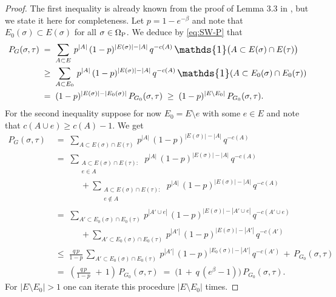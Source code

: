 \documentclass{dis}
\theoremstyle{citing}
\begin{document}
\begin{proof}
The first inequality is already known from the proof of Lemma 3.3 in 
\cite{BCT}, but we state it here for completeness. 
Let $p=1-e^{-\beta}$ and note that $E_0(\sigma)\subset E(\sigma)$ for 
all $\sigma\in{{\Omega}_{\rm P}}$. We deduce by \eqref{eq:SW-P} that
\[\begin{split}
P_G(\sigma,\tau) \;&=\; \sum_{A\subset E} \,p^{{\left\vert {A} \right\vert}}\, 
	(1-p)^{{\left\vert {E(\sigma)} \right\vert}-{\left\vert {A} \right\vert}}\, q^{-c(A)}\, 
	{\scalebox{1.2}{\raisebox{-0.2mm}{$\mathds{1}$}}}\bigl(A\subset E(\sigma)\cap E(\tau)\bigr)\\
&\ge\; \sum_{A\subset E_0} \,p^{{\left\vert {A} \right\vert}}\, 
	(1-p)^{{\left\vert {E(\sigma)} \right\vert}-{\left\vert {A} \right\vert}}\, q^{-c(A)}\, 
	{\scalebox{1.2}{\raisebox{-0.2mm}{$\mathds{1}$}}}(A\subset E_0(\sigma)\cap E_0(\tau))\\
&=\; (1-p)^{{\left\vert {E(\sigma)} \right\vert}-{\left\vert {E_0(\sigma)} \right\vert}}\,P_{G_0}(\sigma,\tau)
\;\ge\; (1-p)^{{\left\vert {E\setminus E_0} \right\vert}}\,P_{G_0}(\sigma,\tau).
\end{split}\]
For the second inequality suppose for now $E_0=E\setminus e$ 
with some $e\in E$ and note that $c(A\cup e)\ge c(A)-1$. We get
\[\begin{split}
P_G(\sigma,\tau) \;&=\; \sum_{A\subset E(\sigma)\cap E(\tau)} 
	\,p^{{\left\vert {A} \right\vert}}\, (1-p)^{{\left\vert {E(\sigma)} \right\vert}-{\left\vert {A} \right\vert}}\, q^{-c(A)} \\
&=\; \sum_{\substack{A\subset E(\sigma)\cap E(\tau):\\ e\in A}} 
	\,p^{{\left\vert {A} \right\vert}}\, (1-p)^{{\left\vert {E(\sigma)} \right\vert}-{\left\vert {A} \right\vert}}\, q^{-c(A)} \\
&\qquad\quad + \sum_{\substack{A\subset E(\sigma)\cap E(\tau):\\ 
		e\notin A}} 
	\,p^{{\left\vert {A} \right\vert}}\, (1-p)^{{\left\vert {E(\sigma)} \right\vert}-{\left\vert {A} \right\vert}}\, q^{-c(A)} \\
&=\; \sum_{A'\subset E_0(\sigma)\cap E_0(\tau)} 
	\,p^{{\left\vert {A'\cup e} \right\vert}}\, 
	(1-p)^{{\left\vert {E(\sigma)} \right\vert}-{\left\vert {A'\cup e} \right\vert}}\, q^{-c(A'\cup e)} \\
&\qquad\quad + \sum_{A'\subset E_0(\sigma)\cap E_0(\tau)} 
	\,p^{{\left\vert {A'} \right\vert}}\, (1-p)^{{\left\vert {E(\sigma)} \right\vert}-{\left\vert {A'} \right\vert}}\, q^{-c(A')} \\
&\le\; \frac{q\,p}{1-p}\,	\sum_{A'\subset E_0(\sigma)\cap E_0(\tau)} 
	\,p^{{\left\vert {A'} \right\vert}}\, (1-p)^{{\left\vert {E_0(\sigma)} \right\vert}-{\left\vert {A'} \right\vert}}\, q^{-c(A')} 
	\,+\, P_{G_0}(\sigma,\tau) \\
&=\; \left(\frac{q\,p}{1-p}\, \,+\, 1\right)\,P_{G_0}(\sigma,\tau)
\;=\; \bigl(1 \,+\, q\, (e^{\beta}-1)\bigr)\,P_{G_0}(\sigma,\tau).
\end{split}\]
For ${\left\vert {E\setminus E_0} \right\vert}>1$ one can iterate this procedure 
${\left\vert {E\setminus E_0} \right\vert}$ times. 
\end{proof}
\end{document}
